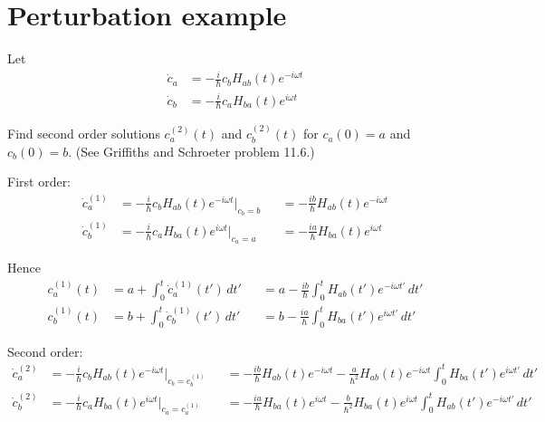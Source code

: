 

\section*{Perturbation example}

Let
\begin{equation*}
\begin{aligned}
\dot c_a&=-\frac{i}{\hbar}c_bH_{ab}(t)e^{-i\omega t}
\\
\dot c_b&=-\frac{i}{\hbar}c_aH_{ba}(t)e^{i\omega t}
\end{aligned}
\end{equation*}

Find second order solutions $c_a^{(2)}(t)$ and $c_b^{(2)}(t)$ for $c_a(0)=a$ and $c_b(0)=b$.
(See Griffiths and Schroeter problem 11.6.)

\bigskip
First order:
\begin{equation*}
\begin{aligned}
\dot c_a^{(1)}&=-\frac{i}{\hbar}c_bH_{ab}(t)e^{-i\omega t}\bigg|_{c_b=b}
&&=-\frac{ib}{\hbar}H_{ab}(t)e^{-i\omega t}
\\
\dot c_b^{(1)}&=-\frac{i}{\hbar}c_aH_{ba}(t)e^{i\omega t}\bigg|_{c_a=a}
&&=-\frac{ia}{\hbar}H_{ba}(t)e^{i\omega t}
\end{aligned}
\tag{1}
\end{equation*}

Hence
\begin{equation*}
\begin{aligned}
c_a^{(1)}(t)&=a+\int_0^t\dot c_a^{(1)}(t')\,dt'
&&=a-\frac{ib}{\hbar}\int_0^tH_{ab}(t')e^{-i\omega t'}\,dt'
\\
c_b^{(1)}(t)&=b+\int_0^t\dot c_b^{(1)}(t')\,dt'
&&=b-\frac{ia}{\hbar}\int_0^tH_{ba}(t')e^{i\omega t'}\,dt'
\end{aligned}
\tag{2}
\end{equation*}

Second order:
\begin{equation*}
\begin{aligned}
\dot c_a^{(2)}&=-\frac{i}{\hbar}c_bH_{ab}(t)e^{-i\omega t}\bigg|_{c_b=c_b^{(1)}}
&&=-\frac{ib}{\hbar}H_{ab}(t)e^{-i\omega t}-\frac{a}{\hbar^2}H_{ab}(t)e^{-i\omega t}
\int_0^tH_{ba}(t')e^{i\omega t'}\,dt'
\\
\dot c_b^{(2)}&=-\frac{i}{\hbar}c_aH_{ba}(t)e^{i\omega t}\bigg|_{c_a=c_a^{(1)}}
&&=-\frac{ia}{\hbar}H_{ba}(t)e^{i\omega t}-\frac{b}{\hbar^2}H_{ba}(t)e^{i\omega t}
\int_0^tH_{ab}(t')e^{-i\omega t'}\,dt'
\end{aligned}
\tag{3}
\end{equation*}

